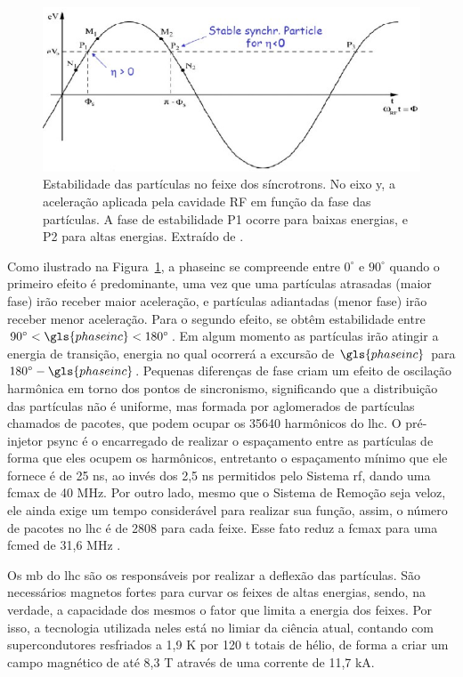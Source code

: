 \begin{figure}[h!t]
\centering
\includegraphics[width=.7\textwidth]{imagens/estabilidade_fase.png}
\caption[Estabilidade das partículas no feixe dos síncrotrons]{Estabilidade das partículas no feixe dos síncrotrons. No eixo y, a
aceleração aplicada pela cavidade RF em função da fase das partículas. 
A fase de estabilidade P1 ocorre para baixas energias, e P2 para altas energias. 
Extraído de \cite{lecture_slides_1}.}
\label{fig:est_sinc}
\end{figure}

Como ilustrado na Figura~\ref{fig:est_sinc}, a \gls{phaseinc} se compreende entre
$0^\circ$ e $90^\circ$ quando o primeiro efeito é predominante, uma vez que uma partículas 
atrasadas (maior fase) irão receber maior aceleração, 
e partículas adiantadas (menor fase) irão receber menor aceleração. Para o
segundo efeito, se obtêm estabilidade entre $90^\circ<\gls{phaseinc}<180^\circ$.
Em algum momento as partículas irão atingir a energia de transição, energia no
qual ocorrerá a excursão de $\gls{phaseinc}$ para $180^\circ - \gls{phaseinc}$. Pequenas
diferenças de fase criam um efeito de oscilação harmônica em torno dos pontos de
sincronismo, significando que a distribuição das partículas não é uniforme, mas
formada por aglomerados de partículas chamados de pacotes, que podem ocupar os
35640 harmônicos do \gls{lhc}. 
O pré-injetor \acrshort{psync} é o encarregado de realizar o espaçamento 
entre as partículas de forma que eles ocupem os harmônicos, entretanto o
espaçamento mínimo que ele fornece é de 25 ns, ao invés dos 2,5 ns permitidos
pelo Sistema \gls{rf}, dando uma \gls{fcmax} de 40 MHz. 
Por outro lado, mesmo que o Sistema de Remoção seja
veloz, ele ainda exige um tempo considerável para realizar sua função, assim, o
número de pacotes no \gls{lhc} é de 2808 para cada feixe. Esse fato reduz a
\gls{fcmax} para uma \gls{fcmed} de 31,6 MHz
\cite{closerLook,lhc_design,lecture_slides_1,lecture_slides_2}.


Os \gls{mb} do \gls{lhc} são os responsáveis por realizar a deflexão
das partículas.  São necessários magnetos fortes para curvar os feixes de altas
energias, sendo, na verdade, a capacidade dos mesmos o fator que limita a energia
dos feixes. Por isso, a tecnologia utilizada neles está no limiar da ciência
atual, contando com supercondutores resfriados a 1,9 K por 120 t totais de hélio, 
de forma a criar um campo magnético de até 8,3 T através de uma corrente de 11,7 kA. 

